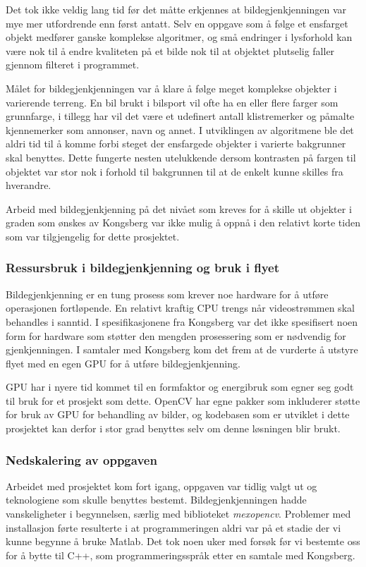 Det tok ikke veldig lang tid før det måtte erkjennes at bildegjenkjenningen var mye mer utfordrende enn først antatt. Selv en oppgave som å følge et ensfarget objekt medfører ganske komplekse algoritmer, og små endringer i lysforhold kan være nok til å endre kvaliteten på et bilde nok til at objektet plutselig faller gjennom filteret i programmet.

Målet for bildegjenkjenningen var å klare å følge meget komplekse objekter i varierende terreng. En bil brukt i bilsport vil ofte ha en eller flere farger som grunnfarge, i tillegg har vil det være et udefinert antall klistremerker og påmalte kjennemerker som annonser, navn og annet. I utviklingen av algoritmene ble det aldri tid til å komme forbi steget der ensfargede objekter i varierte bakgrunner skal benyttes. Dette fungerte nesten utelukkende dersom kontrasten på fargen til objektet var stor nok i forhold til bakgrunnen til at de enkelt kunne skilles fra hverandre.

Arbeid med bildegjenkjenning på det nivået som kreves for å skille ut objekter i graden som ønskes av Kongsberg var ikke mulig å oppnå i den relativt korte tiden som var tilgjengelig for dette prosjektet.


\subsubsection{Ressursbruk i bildegjenkjenning og bruk i flyet}

Bildegjenkjenning er en tung prosess som krever noe hardware for å utføre operasjonen fortløpende. En relativt kraftig CPU trengs når videostrømmen skal behandles i sanntid. I spesifikasjonene fra Kongsberg \cite{LocalHawkPDF} var det ikke spesifisert noen form for hardware som støtter den mengden prosessering som er nødvendig for gjenkjenningen. I samtaler med Kongsberg kom det frem at de vurderte å utstyre flyet med en egen GPU for å utføre bildegjenkjenning. 

GPU har i nyere tid kommet til en formfaktor og energibruk som egner seg godt til bruk for et prosjekt som dette. OpenCV har egne pakker som inkluderer støtte for bruk av GPU for behandling av bilder, og kodebasen som er utviklet i dette prosjektet kan derfor i stor grad benyttes selv om denne løsningen blir brukt.

\subsubsection{Nedskalering av oppgaven}
Arbeidet med prosjektet kom fort igang, oppgaven var tidlig valgt ut og teknologiene som skulle benyttes bestemt. Bildegjenkjenningen hadde vanskeligheter i begynnelsen, særlig med biblioteket \emph{mexopencv}. Problemer med installasjon førte resulterte i at programmeringen aldri var på et stadie der vi kunne begynne å bruke Matlab. Det tok noen uker med forsøk før vi bestemte oss for å bytte til C++, som programmeringsspråk etter en samtale med Kongsberg.

